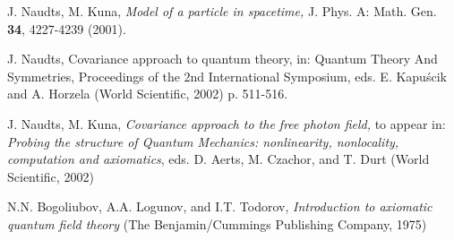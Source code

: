 \documentclass[12pt,a4paper]{article}
\begin{document}
\begin{thebibliography}{99}
 J. Naudts, M. Kuna, {\sl Model of a particle in
spacetime,} J. Phys. A: Math. Gen. {\bf 34}, 4227-4239 (2001).

 J. Naudts, Covariance approach to quantum theory,
in: Quantum Theory And Symmetries, Proceedings of the 2nd International Symposium,
eds. E. Kapu\'scik and A. Horzela (World Scientific, 2002) p. 511-516.

 J. Naudts, M. Kuna,
{\sl Covariance approach to the free photon field,}
to appear in: {\sl Probing the structure of Quantum
Mechanics: nonlinearity, nonlocality, computation and axiomatics},
eds. D. Aerts, M. Czachor, and T. Durt (World Scientific, 2002)

 N.N. Bogoliubov, A.A. Logunov, and I.T. Todorov,
{\sl Introduction to axiomatic quantum field theory}
(The Benjamin/Cummings Publishing Company, 1975)


\end{thebibliography}
\end{document}
